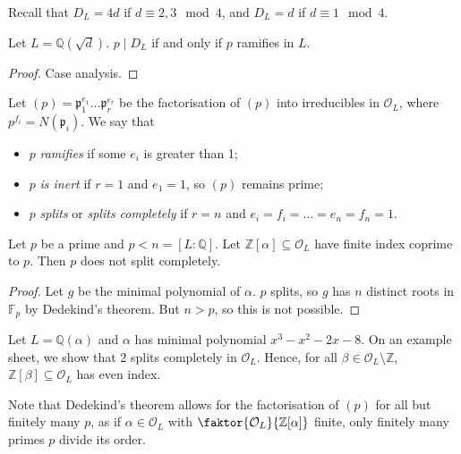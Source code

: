 Recall that \( D_L = 4d \) if \( d \equiv 2, 3 \mod 4 \), and \( D_L = d \) if \( d \equiv 1 \mod 4 \).
\begin{corollary}
    Let \( L = \mathbb Q(\sqrt{d}) \).
    \( p \mid D_L \) if and only if \( p \) ramifies in \( L \).
\end{corollary}
\begin{proof}
    Case analysis.
\end{proof}
\begin{definition}
    Let \( (p) = \mathfrak p_1^{e_1} \dots \mathfrak p_r^{e_r} \) be the factorisation of \( (p) \) into irreducibles in \( \mathcal O_L \), where \( p^{f_i} = N(\mathfrak p_i) \).
    We say that
    \begin{itemize}
        \item \( p \) \emph{ramifies} if some \( e_i \) is greater than 1;
        \item \( p \) \emph{is inert} if \( r = 1 \) and \( e_1 = 1 \), so \( (p) \) remains prime;
        \item \( p \) \emph{splits} or \emph{splits completely} if \( r = n \) and \( e_i = f_i = \dots = e_n = f_n = 1 \).
    \end{itemize}
\end{definition}
\begin{corollary}
    Let \( p \) be a prime and \( p < n = [L:\mathbb Q] \).
    Let \( \mathbb Z[\alpha] \subseteq \mathcal O_L \) have finite index coprime to \( p \).
    Then \( p \) does not split completely.
\end{corollary}
\begin{proof}
    Let \( g \) be the minimal polynomial of \( \alpha \).
    \( p \) splits, so \( g \) has \( n \) distinct roots in \( \mathbb F_p \) by Dedekind's theorem.
    But \( n > p \), so this is not possible.
\end{proof}
\begin{example}
    Let \( L = \mathbb Q(\alpha) \) and \( \alpha \) has minimal polynomial \( x^3 - x^2 - 2x - 8 \).
    On an example sheet, we show that 2 splits completely in \( \mathcal O_L \).
    Hence, for all \( \beta \in \mathcal O_L \setminus \mathbb Z \), \( \mathbb Z[\beta] \subseteq \mathcal O_L \) has even index.
\end{example}
Note that Dedekind's theorem allows for the factorisation of \( (p) \) for all but finitely many \( p \), as if \( \alpha \in \mathcal O_L \) with \( \faktor{\mathcal O_L}{\mathbb Z[\alpha]} \) finite, only finitely many primes \( p \) divide its order.
